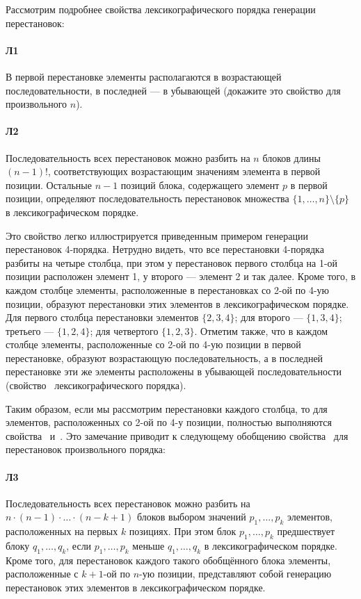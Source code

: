 \documentclass[12pt,a4paper]{article}
\theoremstyle{plain}
\theoremstyle{definition}
\theoremstyle{remark}
\begin{document}
Рассмотрим подробнее свойства лексикографического порядка генерации перестановок:

\paragraph*{Л1}
\label{L1}
В первой перестановке элементы располагаются в возрастающей последовательности, в последней --- в убывающей (докажите это свойство для произвольного $n$).

\paragraph*{Л2}
\label{L2}
Последовательность всех перестановок можно разбить на $n$ блоков длины $(n-1)!$, соответствующих возрастающим значениям элемента в первой позиции. Остальные $n-1$ позиций блока, содержащего элемент $p$ в первой позиции, определяют последовательность перестановок множества $\{1,\ldots,n\}\setminus \{p\}$ в
лексикографическом порядке.

Это свойство легко иллюстрируется приведенным примером генерации перестановок 4-порядка. Нетрудно видеть, что все перестановки 4-порядка разбиты на четыре столбца, при этом у перестановок первого столбца на 1-ой позиции расположен элемент 1, у второго --- элемент 2 и так далее. Кроме того, в каждом столбце элементы, расположенные в перестановках со 2-ой по 4-ую позиции, образуют перестановки этих элементов в лексикографическом порядке. Для первого столбца перестановки элементов $\{2,3,4\}$; для второго --- $\{1,3,4\}$; третьего --- $\{1,2,4\}$; для четвертого $\{1,2,3\}$. Отметим также, что в каждом столбце элементы, расположенные со 2-ой по 4-ую позиции в первой перестановке, образуют возрастающую последовательность, а в последней перестановке эти же элементы расположены в убывающей последовательности (свойство~ лексикографического порядка).

Таким образом, если мы рассмотрим перестановки каждого столбца, то для элементов, расположенных со 2-ой по 4-у позиции, полностью выполняются свойства~ и~. Это замечание приводит к следующему обобщению свойства~ для перестановок произвольного порядка:

\paragraph*{Л3}
\label{L3}
Последовательность всех перестановок можно разбить на $n\cdot(n-1)\cdot\ldots\cdot(n-k+1)$ блоков выбором значений $p_1,\ldots,p_k$ элементов, расположенных на первых $k$ позициях. При этом блок $p_1,\ldots,p_k$ предшествует блоку $q_1,\ldots,q_k$, если $p_1,\ldots,p_k$ меньше $q_1,\ldots,q_k$ в лексикографическом порядке. Кроме того, для перестановок каждого такого обобщённого блока элементы, расположенные с $k+1$-ой по $n$-ую позиции, представляют собой генерацию перестановок этих элементов в лексикографическом порядке.
\end{document}
